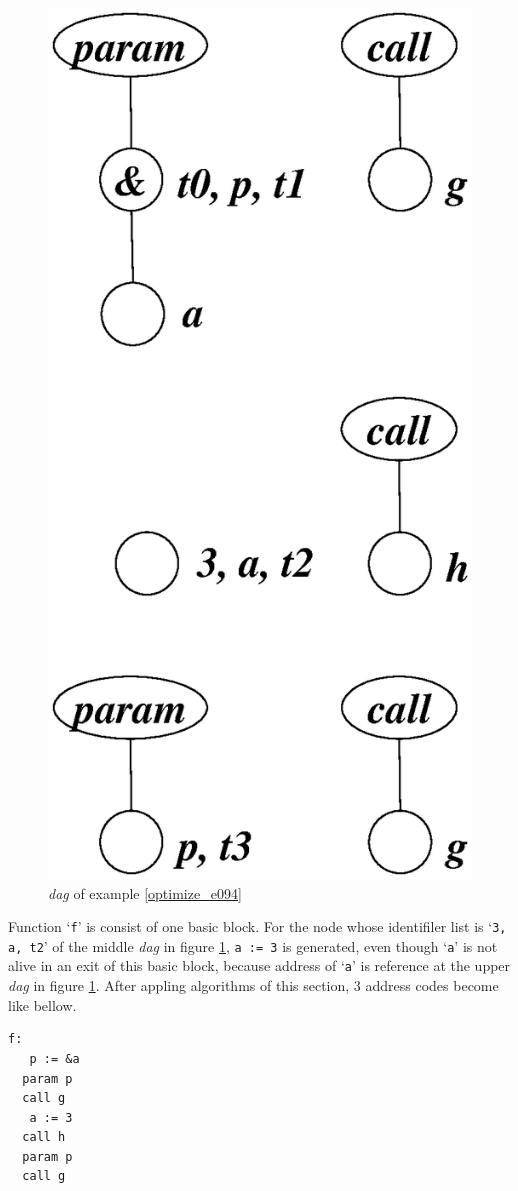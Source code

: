 \begin{Example}
\begin{figure}[htbp]
\begin{center}
\begin{latexonly}
\includegraphics[width=0.496\linewidth,height=1.0\linewidth]{opt041.eps}
\end{latexonly}
\caption{{\em dag} of example \ref{optimize_e094}}
\label{optimize_e095}
\end{center}
\end{figure}
Function `{\tt{f}}' is consist of one basic block.
For the node whose identifiler list is `{\tt{3, a, t2}}' of the
middle {\em dag} in figure \ref{optimize_e095},
{\tt{a := 3}} is generated, even though `{\tt{a}}' is
not alive in an exit of this basic block,
because address of `{\tt{a}}' is reference at the upper {\em dag} 
in figure \ref{optimize_e095}.
After appling algorithms of this section,
3 address codes become like bellow.
\begin{verbatim}
f:
   p := &a
  param p
  call g
   a := 3
  call h
  param p
  call g
\end{verbatim}
\end{Example}

